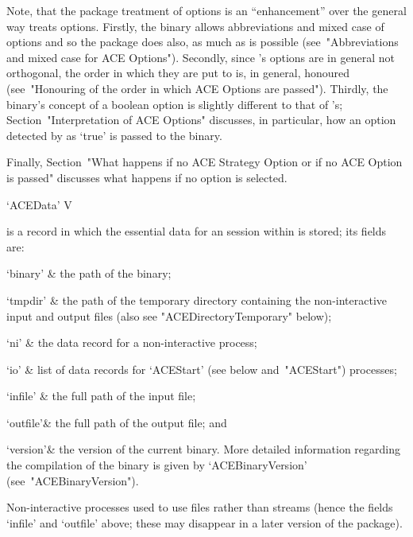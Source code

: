 Note,  that  the  {\ACE}  package   treatment   of   options   is   an
``enhancement'' over the general way {\GAP} treats  options.  Firstly,
the {\ACE} binary allows abbreviations and mixed case of  options  and
so  the  {\ACE}  package  does  also,   as   much   as   is   possible
(see~"Abbreviations and mixed case for ACE Options"). Secondly,  since
{\ACE}'s options are in general not orthogonal,  the  order  in  which
they are put to {\ACE} is, in general, honoured (see~"Honouring of the
order in which ACE Options are passed"). Thirdly, the {\ACE}  binary's
concept of a boolean option is slightly different to that of {\GAP}'s;
Section~"Interpretation of ACE Options" discusses, in particular,  how
an option detected by {\GAP} as `true' is passed to the {\ACE} binary.

Finally, Section~"What happens if no ACE Strategy Option or if no  ACE
Option is passed" discusses what happens if no option is selected.


\>`ACEData' V

is a {\GAP} record in which the essential data for an  {\ACE}  session
within {\GAP} is stored; its fields are:

\beginitems

\quad`binary' & the path of the {\ACE} binary;

\quad`tmpdir' & the path of the  temporary  directory  containing  the
non-interactive   {\ACE}   input   and   output   files   (also    see
"ACEDirectoryTemporary" below);

\quad`ni'     & the data record for a non-interactive {\ACE} process;

\quad`io'     & list  of  data  records  for  `ACEStart'   (see  below 
and~"ACEStart") processes;

\quad`infile' & the full path of the {\ACE} input file;

\quad`outfile'& the full path of the {\ACE} output file; and

\quad`version'& the  version  of  the  current  {\ACE}  binary.   More
detailed information regarding the compilation of the binary is  given
by `ACEBinaryVersion' (see~"ACEBinaryVersion").

\enditems

Non-interactive processes used to use files rather than streams (hence
the fields `infile' and `outfile' above;  these  may  disappear  in  a
later version of the {\ACE} package).

